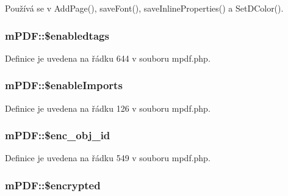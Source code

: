 Používá se v Add\-Page(), save\-Font(), save\-Inline\-Properties() a Set\-D\-Color().

\hypertarget{classm_p_d_f_ac1173d37418aa43afa7ca49de50d0f2c}{
\subsubsection[{\$enabledtags}]{\setlength{\rightskip}{0pt plus 5cm}m\-P\-D\-F\-::\$enabledtags}}\label{classm_p_d_f_ac1173d37418aa43afa7ca49de50d0f2c}


Definice je uvedena na řádku 644 v souboru mpdf.\-php.

\hypertarget{classm_p_d_f_a27630893ef906a946edb41b788888f37}{
\subsubsection[{\$enable\-Imports}]{\setlength{\rightskip}{0pt plus 5cm}m\-P\-D\-F\-::\$enable\-Imports}}\label{classm_p_d_f_a27630893ef906a946edb41b788888f37}


Definice je uvedena na řádku 126 v souboru mpdf.\-php.

\hypertarget{classm_p_d_f_a3cffb98f1aed88500f29cdf7a14c8d14}{
\subsubsection[{\$enc\-\_\-obj\-\_\-id}]{\setlength{\rightskip}{0pt plus 5cm}m\-P\-D\-F\-::\$enc\-\_\-obj\-\_\-id}}\label{classm_p_d_f_a3cffb98f1aed88500f29cdf7a14c8d14}


Definice je uvedena na řádku 549 v souboru mpdf.\-php.

\hypertarget{classm_p_d_f_ae5c9e37cf2c83323ac861e3689477e5e}{
\subsubsection[{\$encrypted}]{\setlength{\rightskip}{0pt plus 5cm}m\-P\-D\-F\-::\$encrypted}}\label{classm_p_d_f_ae5c9e37cf2c83323ac861e3689477e5e}


